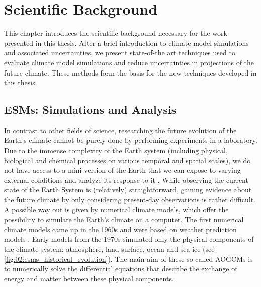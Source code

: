 


\chapter{Scientific Background}
\label{ch:02:scientific_background}

This chapter introduces the scientific background necessary for the work
presented in this thesis. After a brief introduction to climate model
simulations and associated uncertainties, we present state-of-the art
techniques used to evaluate climate model simulations and reduce uncertainties
in projections of the future climate. These methods form the basis for the new
techniques developed in this thesis.


\section{\aclp{ESM}: Simulations and Analysis}
\label{sec:02:esms}

In contrast to other fields of science, researching the future evolution of the
Earth's climate cannot be purely done by performing experiments in a
laboratory. Due to the immense complexity of the Earth system (including
physical, biological and chemical processes on various temporal and spatial
scales), we do not have access to a mini version of the Earth that we can
expose to varying external conditions and analyze its response to it
\autocite{Flato2011}. While observing the current state of the Earth System is
(relatively) straightforward, gaining evidence about the future climate by only
considering present-day observations is rather difficult. A possible way out is
given by numerical climate models, which offer the possibility to simulate the
Earth's climate on a computer. The first numerical climate models came up in
the 1960s and were based on weather prediction models \autocite{Flato2011}.
Early models from the 1970s simulated only the physical components of the
climate system: atmosphere, land surface, ocean and sea ice (see
\cref{fig:02:esms_historical_evolution}). The main aim of these so-called
\acp{AOGCM} \autocite{Flato2013} is to numerically solve the differential
equations that describe the exchange of energy and matter between these
physical components.

